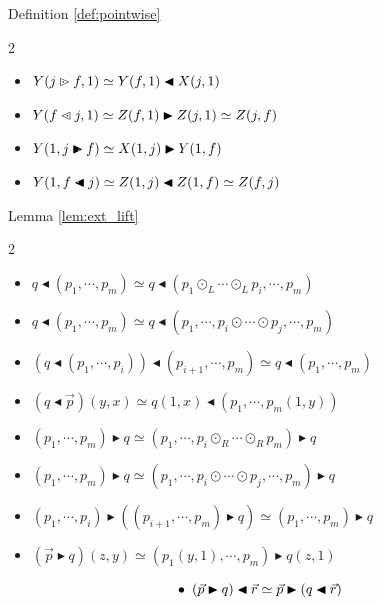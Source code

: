 \documentclass[10pt,a4paper]{article}
\newcommand{\flip}[1]{\text{\rotatebox[origin=c]{-180}{$#1$}}}
\newcommand{\plext}{\mathbin{{\rhd}\mathclap{\mspace{-17.5mu}\cdot}}}
\newcommand{\plift}{\mathbin{\flip{{\rhd}\mathclap{\mspace{-17.5mu}\cdot}}}}
\newcommand{\prext}{\mathbin{{\blacktriangleright}\mathclap{\mspace{-10.5mu}\raisebox{-0.45pt}{\textcolor{white}{$\cdot$}}}}}
\newcommand{\prift}{\mathbin{\flip{{\blacktriangleright}\mathclap{\mspace{-10.5mu}\raisebox{-0.45pt}{\textcolor{white}{$\cdot$}}}}}}
\newcommand{\rext}{\mathbin{\blacktriangleright}}
\newcommand{\rift}{\mathbin{\blacktriangleleft}}
\theoremstyle{plain}
\theoremstyle{definition}
\theoremstyle{remark}
\begin{document}
\begin{center}
    Definition \ref{def:pointwise}
\end{center}

\begin{multicols}{2}
    \begin{itemize}
        \item $Y(j \plext f, 1) \simeq Y(f, 1) \rift X(j, 1)$
        \item $Y(f\plift j, 1) \simeq Z(f, 1) \rext Z(j, 1) \simeq Z(j, f)$
        \item $Y(1, j\prext f) \simeq X(1, j) \rext Y(1, f)$
        \item $Y(1, f\prift j) \simeq Z(1, j) \rift Z(1, f) \simeq Z(f, j)$
    \end{itemize}
\end{multicols}

\begin{center}
    Lemma \ref{lem:ext_lift}
\end{center}

\begin{multicols}{2}
    \begin{itemize}
        \item $q \rift (p_1, \cdots, p_m) \simeq q \rift (p_1 \odot_L \cdots \odot_L p_i ,\cdots, p_m)$
        \item $q \rift (p_1, \cdots, p_m) \simeq q \rift (p_1, \cdots, p_i \odot \cdots \odot p_j, \cdots, p_m)$
        \item $(q \rift (p_1, \cdots, p_i)) \rift (p_{i+1}, \cdots, p_m) \simeq q \rift(p_1, \cdots, p_m)$
        \item $(q \rift \vec{p})(y, x) \simeq q(1, x) \rift (p_1, \cdots, p_m(1, y))$
        \item $(p_1, \cdots, p_m) \rext q \simeq (p_1, \cdots, p_i \odot_R \cdots \odot_R p_m) \rext q$
        \item $(p_1, \cdots, p_m) \rext q \simeq (p_1, \cdots, p_i \odot \cdots \odot p_j, \cdots, p_m) \rext q$
        \item $(p_1, \cdots, p_i) \rext ((p_{i+1}, \cdots, p_m) \rext q) \simeq (p_1, \cdots, p_m) \rext q$
        \item $(\vec{p} \rext q)(z, y) \simeq (p_1(y, 1), \cdots, p_m)\rext q(z, 1)$
    \end{itemize}
\end{multicols}
\vspace{-2\baselineskip+2\parsep}
$$\bullet\hspace{.5em}(\vec{p} \rext q) \rift \vec{r} \simeq \vec{p} \rext (q \rift \vec{r})$$
\end{document}
